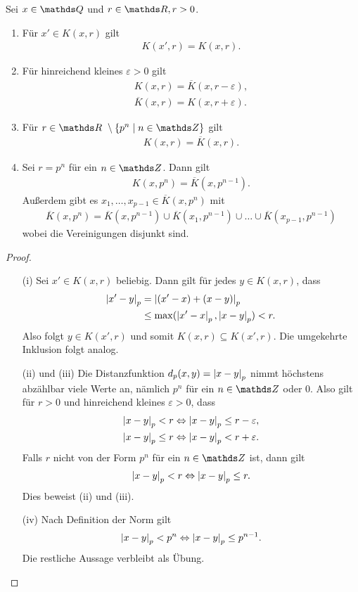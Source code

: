 \begin{satz}
Sei $x\in \Q$ und $r \in \R, r>0$.
\begin{enumerate}[label=(\roman*)]
\item Für $x'\in K(x,r)$ gilt
\begin{align*}
K(x',r)=K(x,r).
\end{align*}
\item Für hinreichend kleines $\varepsilon>0$ gilt
\begin{align*}
K(x,r)=\overline{K}(x,r-\varepsilon),\\
\overline{K}(x,r)=K(x,r+\varepsilon).
\end{align*}
\item Für $r\in \R\ \setminus \{p^n \mid n\in \Z\}$ gilt
\begin{align*}
K(x,r)=\overline{K}(x,r).
\end{align*}
\item Sei $r=p^n$ für ein $n\in \Z$. Dann gilt
\begin{align*}
K(x,p^n)=\overline{K}(x,p^{n-1}).
\end{align*}
Außerdem gibt es $x_1,\dots,x_{p-1}\in \overline{K}(x,p^n)$ mit
\begin{align*}
\overline{K}(x,p^n)=\overline{K}(x,p^{n-1})\cup \overline{K}(x_1,p^{n-1})\cup \dots \cup \overline{K}(x_{p-1},p^{n-1})
\end{align*}
wobei die Vereinigungen disjunkt sind.
\end{enumerate}
\begin{proof}
\begin{enumerate}
\item[(i)] Sei $x'\in K(x,r)$ beliebig.
Dann gilt für jedes $y\in K(x,r)$, dass 
\begin{align*}
\left\vert x'-y\right\vert_p&=\left\vert(x'-x)+(x-y)\right\vert_p\\
&\leq \max(\left\vert x'-x\right\vert_p,\left\vert x-y\right\vert_p)<r.
\end{align*}
Also folgt $y\in K(x',r)$ und somit $K(x,r)\subseteq K(x',r)$.
Die umgekehrte Inklusion folgt analog.
\item[(ii) und (iii)] Die Distanzfunktion $d_p(x,y)=\left\vert x-y\right\vert_p$ nimmt höchstens abzählbar viele Werte an, nämlich $p^n$ für ein $n\in \Z$ oder $0$.
Also gilt für $r>0$ und hinreichend kleines $\varepsilon>0$, dass
\begin{align*}
\left\vert x-y\right\vert_p<r \Leftrightarrow \left\vert x-y\right\vert_p \leq r-\varepsilon,\\
\left\vert x-y\right\vert_p \leq r \Leftrightarrow \left\vert x-y\right\vert_p<r+\varepsilon.
\end{align*}
Falls $r$ nicht von der Form $p^n$ für ein $n\in \Z$ ist, dann gilt
\begin{align*}
\left\vert x-y\right\vert_p<r \Leftrightarrow \left\vert x-y\right\vert_p\leq r.
\end{align*}
Dies beweist (ii) und (iii).
\item[(iv)] Nach Definition der Norm gilt
\begin{align*}
\left\vert x-y\right\vert_p<p^n \Leftrightarrow \left\vert x-y\right\vert_p\leq p^{n-1}.
\end{align*}
Die restliche Aussage verbleibt als Übung.
\qedhere
\end{enumerate}
\end{proof}
\end{satz}
